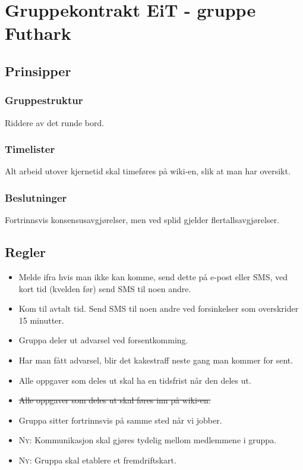 \documentclass[a4paper, norsk, 12pt]{report}
\begin{document}
\chapter*{Gruppekontrakt EiT - gruppe Futhark}
\section*{Prinsipper}
\subsection*{Gruppestruktur}
Riddere av det runde bord.

\subsection*{Timelister}
Alt arbeid utover kjernetid skal timeføres på wiki-en, slik at man har oversikt.

\subsection*{Beslutninger}
Fortrinnsvis konsensusavgjørelser, men ved splid gjelder flertallsavgjørelser.

\section*{Regler}
\begin{itemize}
 \item Melde ifra hvis man ikke kan komme, send dette på e-post eller SMS, ved kort tid (kvelden før) send SMS til noen andre.
 \item Kom til avtalt tid. Send SMS til noen andre ved forsinkelser som overskrider 15 minutter.
 \item Gruppa deler ut advarsel ved forsentkomming.
 \item Har man fått advarsel, blir det kakestraff neste gang man kommer for sent.
 \item Alle oppgaver som deles ut skal ha en tidsfrist når den deles ut.
 \item \sout{Alle oppgaver som deles ut skal føres inn på wiki-en.}
 \item Gruppa sitter fortrinnsvis på samme sted når vi jobber.
 \item \textsc{Ny:} Kommunikasjon skal gjøres tydelig mellom medlemmene i
   gruppa.
 \item \textsc{Ny:} Gruppa skal etablere et fremdriftskart.
\end{itemize}
\end{document}
